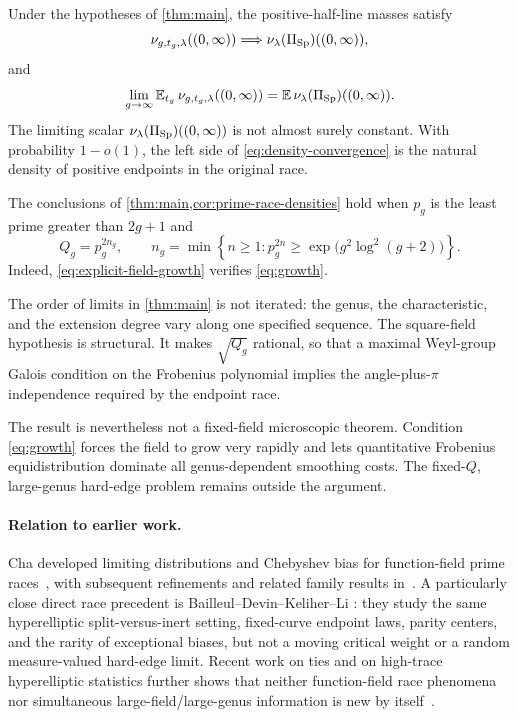 \begin{corollary}
\label{cor:prime-race-densities}
Under the hypotheses of \cref{thm:main}, the positive-half-line masses satisfy
\begin{equation}
 \nu_{g,t_g,\lambda}((0,\infty))
 \Longrightarrow
 \nu_\lambda(\Pi_{\mathrm{Sp}})((0,\infty)),
\label{eq:density-convergence}
\end{equation}
and
\[
 \lim_{g\to\infty}\mathbb E_{t_g}\,
 \nu_{g,t_g,\lambda}((0,\infty))
 =\mathbb E\,\nu_\lambda(\Pi_{\mathrm{Sp}})((0,\infty)).
\]
The limiting scalar \(\nu_\lambda(\Pi_{\mathrm{Sp}})((0,\infty))\) is not almost surely
constant.  With probability \(1-o(1)\), the left side of
\eqref{eq:density-convergence} is the natural density of positive endpoints in
the original race.
\end{corollary}

\begin{example}
\label{ex:explicit-fields}
The conclusions of \cref{thm:main,cor:prime-race-densities} hold when \(p_g\)
is the least prime greater
than \(2g+1\) and
\begin{equation}
 Q_g=p_g^{2n_g},\qquad
 n_g=\min\left\{n\ge1:p_g^{2n}\ge
 \exp\!\bigl(g^2\log^2(g+2)\bigr)\right\}.
\label{eq:explicit-fields}
\end{equation}
Indeed, \cref{eq:explicit-field-growth} verifies \cref{eq:growth}.
\end{example}

The order of limits in \cref{thm:main} is not iterated: the genus, the
characteristic, and the extension degree vary along one specified sequence.
The square-field hypothesis is structural.  It makes \(\sqrt{Q_g}\) rational,
so that a maximal Weyl-group Galois condition on the Frobenius polynomial
implies the angle-plus-\(\pi\) independence required by the endpoint race.

The result is nevertheless not a fixed-field microscopic theorem.  Condition
\eqref{eq:growth} forces the field to grow very rapidly and lets quantitative
Frobenius equidistribution dominate all genus-dependent smoothing costs.  The
fixed-\(Q\), large-genus hard-edge problem remains outside the argument.

\paragraph{Relation to earlier work.}
Cha developed limiting distributions and Chebyshev bias for function-field
prime races~\cite{Cha2008}, with subsequent refinements and related family
results in~\cite{ChaKim2010,ChaFiorilliJouve2016,Bailleul2022}.  A
particularly close direct race precedent is Bailleul--Devin--Keliher--Li
\cite{BailleulDevinKeliherLi2024}: they study the same hyperelliptic
split-versus-inert setting, fixed-curve endpoint laws, parity centers, and the
rarity of exceptional biases, but not a moving critical weight or a random
measure-valued hard-edge limit.  Recent work on ties and on high-trace
hyperelliptic statistics further shows that neither function-field race
phenomena nor simultaneous large-field/large-genus information is new by
itself~\cite{BatesEtAl2026,LalinEtAl2026}.

